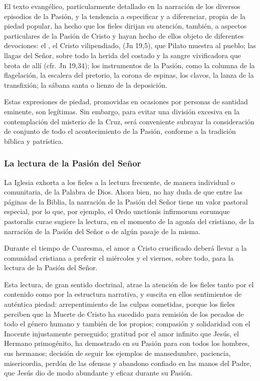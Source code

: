 \begin{introstyle}
El texto evangélico, particularmente detallado en la narración de los diversos episodios de la Pasión, y la tendencia a especificar y a diferenciar, propia de la piedad popular, ha hecho que los fieles dirijan su atención, también, a aspectos particulares de la Pasión de Cristo y hayan hecho de ellos objeto de diferentes devociones: el , el Cristo vilipendiado,  (Jn 19,5), que Pilato muestra al pueblo; las llagas del Señor, sobre todo la herida del costado y la sangre vivificadora que brota de allí (cfr. Jn 19,34); los instrumentos de la Pasión, como la columna de la flagelación, la escalera del pretorio, la corona de espinas, los clavos, la lanza de la transfixión; la sábana santa o lienzo de la deposición.

Estas expresiones de piedad, promovidas en ocasiones por personas de santidad eminente, son legítimas. Sin embargo, para evitar una división excesiva en la contemplación del misterio de la Cruz, será conveniente subrayar la consideración de conjunto de todo el acontecimiento de la Pasión, conforme a la tradición bíblica y patrística.

\subsubsection{La lectura de la Pasión del Señor}

La Iglesia exhorta a los fieles a la lectura frecuente, de manera individual o comunitaria, de la Palabra de Dios. Ahora bien, no hay duda de que entre las páginas de la Biblia, la narración de la Pasión del Señor tiene un valor pastoral especial, por lo que, por ejemplo, el Ordo unctionis infirmorum eorumque pastoralis curae sugiere la lectura, en el momento de la agonía del cristiano, de la narración de la Pasión del Señor o de algún pasaje de la misma.

Durante el tiempo de Cuaresma, el amor a Cristo crucificado deberá llevar a la comunidad cristiana a preferir el miércoles y el viernes, sobre todo, para la lectura de la Pasión del Señor.

Esta lectura, de gran sentido doctrinal, atrae la atención de los fieles tanto por el contenido como por la estructura narrativa, y suscita en ellos sentimientos de auténtica piedad: arrepentimiento de las culpas cometidas, porque los fieles perciben que la Muerte de Cristo ha sucedido para remisión de los pecados de todo el género humano y también de los propios; compasión y solidaridad con el Inocente injustamente perseguido; gratitud por el amor infinito que Jesús, el Hermano primogénito, ha demostrado en su Pasión para con todos los hombres, sus hermanos; decisión de seguir los ejemplos de mansedumbre, paciencia, misericordia, perdón de las ofensas y abandono confiado en las manos del Padre, que Jesús dio de modo abundante y eficaz durante su Pasión.


\end{introstyle}

